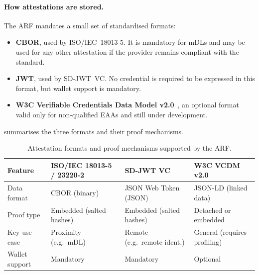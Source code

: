 \documentclass{article}
\begin{document}
\paragraph{How attestations are stored.} The ARF mandates a small set of standardised formats:
\begin{itemize}[noitemsep]
  \item \textbf{CBOR}, used by ISO/IEC~18013-5. It is mandatory for mDLs and may be used for any other attestation if the
        provider remains compliant with the standard.
  \item \textbf{JWT}, used by SD-JWT~VC. No credential is required to be expressed in this format, but wallet support is
        mandatory.
  \item \textbf{W3C Verifiable Credentials Data Model v2.0}~\cite{w3cvcdm}, an optional format valid only for
        non-qualified EAAs and still under development.
\end{itemize}
 summarises the three formats and their proof mechanisms.

\begin{table}[ht]
  \centering
  \caption{Attestation formats and proof mechanisms supported by the ARF.}
  \label{tab:formats}
  \small
  \begin{tabularx}{\textwidth}{@{}l L L L@{}}
    \toprule
    \textbf{Feature} & \textbf{ISO/IEC 18013-5 / 23220-2} & \textbf{SD-JWT VC} & \textbf{W3C VCDM v2.0} \\
    \midrule
    Data format    & CBOR (binary)            & JSON Web Token (JSON)        & JSON-LD (linked data) \\
    Proof type     & Embedded (salted hashes) & Embedded (salted hashes)     & Detached or embedded \\
    Key use case   & Proximity (e.g.\ mDL)    & Remote (e.g.\ remote ident.) & General (requires profiling) \\
    Wallet support & Mandatory                & Mandatory                    & Optional \\
    \bottomrule
  \end{tabularx}
\end{table}
\end{document}
